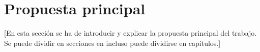 \chapter{Propuesta principal}\label{cap:propuesta}

[En esta sección se ha de introducir y explicar la propuesta principal del trabajo. Se puede dividir en secciones en incluso puede dividirse en capítulos.]